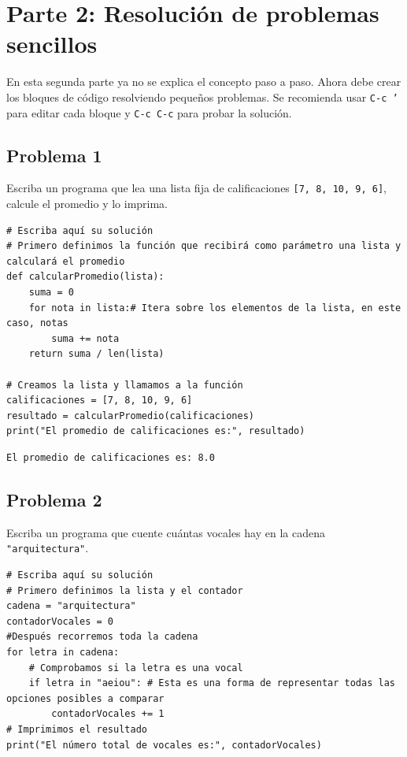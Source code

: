 \documentclass{article}
\begin{document}
\section{Parte 2: Resolución de problemas sencillos}
\label{sec:org201efe0}
En esta segunda parte ya no se explica el concepto paso a paso. Ahora debe crear los bloques de código resolviendo pequeños problemas. Se recomienda usar \texttt{C-c '} para editar cada bloque y \texttt{C-c C-c} para probar la solución.

\subsection{Problema 1}
\label{sec:org8e045af}
Escriba un programa que lea una lista fija de calificaciones \texttt{[7, 8, 10, 9, 6]}, calcule el promedio y lo imprima.

\begin{verbatim}
# Escriba aquí su solución
# Primero definimos la función que recibirá como parámetro una lista y calculará el promedio
def calcularPromedio(lista):
    suma = 0
    for nota in lista:# Itera sobre los elementos de la lista, en este caso, notas
        suma += nota
    return suma / len(lista)

# Creamos la lista y llamamos a la función
calificaciones = [7, 8, 10, 9, 6]
resultado = calcularPromedio(calificaciones)
print("El promedio de calificaciones es:", resultado)
\end{verbatim}

\begin{verbatim}
El promedio de calificaciones es: 8.0
\end{verbatim}

\subsection{Problema 2}
\label{sec:org835ec92}
Escriba un programa que cuente cuántas vocales hay en la cadena \texttt{"arquitectura"}.

\begin{verbatim}
# Escriba aquí su solución
# Primero definimos la lista y el contador
cadena = "arquitectura"
contadorVocales = 0
#Después recorremos toda la cadena
for letra in cadena:
    # Comprobamos si la letra es una vocal
    if letra in "aeiou": # Esta es una forma de representar todas las opciones posibles a comparar
        contadorVocales += 1
# Imprimimos el resultado
print("El número total de vocales es:", contadorVocales)
\end{verbatim}
\end{document}
